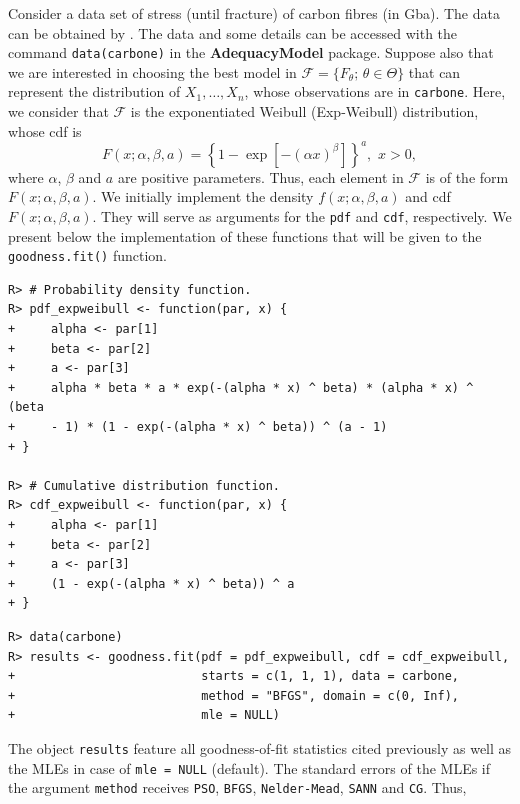 \documentclass[10pt,letterpaper]{article}
\begin{document}
Consider a data set of stress (until fracture) of carbon fibres (in Gba). The data can be obtained by \cite{nicholspadgett2006}.
The data and some details can be accessed with the command \texttt{data(carbone)} in the \textbf{AdequacyModel} package. Suppose also that we are interested
in choosing the best model in $\mathcal{F}=\{F_\theta;\, \theta \in \Theta \}$ that can represent the distribution of $X_1, \ldots, X_n$,
whose observations are in \texttt{carbone}. Here, we consider that $\mathcal{F}$ is the exponentiated Weibull (Exp-Weibull) distribution, whose cdf
is $$F(x;\alpha, \beta, a) = \left\{1 - \exp\left[-(\alpha x)^\beta\right]\right\}^a,\,\,x>0,$$
where $\alpha$, $\beta$ and $a$ are positive parameters. Thus, each element in $\mathcal{F}$ is of the form $F(x;\alpha,\beta,a)$.
We initially implement the density $f(x; \alpha, \beta, a)$ and cdf $F(x; \alpha, \beta, a)$. They will serve as arguments for
the \texttt{pdf} and \texttt{cdf}, respectively. We present below the implementation of these functions
that will be given to the \texttt{goodness.fit()} function.
\begin{verbatim}
R> # Probability density function.
R> pdf_expweibull <- function(par, x) {
+     alpha <- par[1]
+     beta <- par[2]
+     a <- par[3]
+     alpha * beta * a * exp(-(alpha * x) ^ beta) * (alpha * x) ^ (beta
+     - 1) * (1 - exp(-(alpha * x) ^ beta)) ^ (a - 1)
+ }

R> # Cumulative distribution function.
R> cdf_expweibull <- function(par, x) {
+     alpha <- par[1]
+     beta <- par[2]
+     a <- par[3]
+     (1 - exp(-(alpha * x) ^ beta)) ^ a
+ }
\end{verbatim}
\begin{verbatim}
R> data(carbone)
R> results <- goodness.fit(pdf = pdf_expweibull, cdf = cdf_expweibull,
+                          starts = c(1, 1, 1), data = carbone, 
+                          method = "BFGS", domain = c(0, Inf),
+                          mle = NULL)
\end{verbatim}
The object \texttt{results} feature all goodness-of-fit statistics cited previously as well as the MLEs in case of \texttt{mle = NULL} (default).
The standard errors of the MLEs if the argument \texttt{method} receives \texttt{PSO}, \texttt{BFGS}, \texttt{Nelder-Mead}, \texttt{SANN} and \texttt{CG}. Thus,
\end{document}
